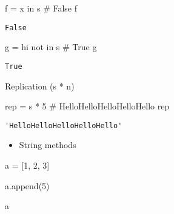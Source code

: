 \documentclass[
  letterpaper,
  DIV=11,
  numbers=noendperiod]{scrreprt}
\newenvironment{Shaded}{\begin{snugshade}}{\end{snugshade}}
\newcommand{\CommentTok}[1]{\textcolor[rgb]{0.37,0.37,0.37}{#1}}
\newcommand{\DecValTok}[1]{\textcolor[rgb]{0.68,0.00,0.00}{#1}}
\newcommand{\KeywordTok}[1]{\textcolor[rgb]{0.00,0.46,0.62}{#1}}
\newcommand{\NormalTok}[1]{\textcolor[rgb]{0.00,0.46,0.62}{#1}}
\newcommand{\OperatorTok}[1]{\textcolor[rgb]{0.37,0.37,0.37}{#1}}
\newcommand{\StringTok}[1]{\textcolor[rgb]{0.13,0.47,0.30}{#1}}
\providecommand{\tightlist}{%
  \setlength{\itemsep}{0pt}\setlength{\parskip}{0pt}}
\begin{document}
\begin{Shaded}
\begin{Highlighting}[]
\NormalTok{f }\OperatorTok{=} \StringTok{\textquotesingle{}x\textquotesingle{}} \KeywordTok{in}\NormalTok{ s            }\CommentTok{\# False}
\NormalTok{f}
\end{Highlighting}
\end{Shaded}

\begin{verbatim}
False
\end{verbatim}

\begin{Shaded}
\begin{Highlighting}[]
\NormalTok{g }\OperatorTok{=} \StringTok{\textquotesingle{}hi\textquotesingle{}} \KeywordTok{not} \KeywordTok{in}\NormalTok{ s       }\CommentTok{\# True}
\NormalTok{g}
\end{Highlighting}
\end{Shaded}

\begin{verbatim}
True
\end{verbatim}

Replication (s * n)

\begin{Shaded}
\begin{Highlighting}[]
\NormalTok{rep }\OperatorTok{=}\NormalTok{ s }\OperatorTok{*} \DecValTok{5}             \CommentTok{\# \textquotesingle{}HelloHelloHelloHelloHello\textquotesingle{}}
\NormalTok{rep}
\end{Highlighting}
\end{Shaded}

\begin{verbatim}
'HelloHelloHelloHelloHello'
\end{verbatim}

\begin{itemize}
\tightlist
\item
  String methods
\end{itemize}

\begin{Shaded}
\begin{Highlighting}[]
\NormalTok{a }\OperatorTok{=}\NormalTok{ [}\DecValTok{1}\NormalTok{, }\DecValTok{2}\NormalTok{, }\DecValTok{3}\NormalTok{]}

\NormalTok{a.append(}\DecValTok{5}\NormalTok{)}
\end{Highlighting}
\end{Shaded}

\begin{Shaded}
\begin{Highlighting}[]
\NormalTok{a}
\end{Highlighting}
\end{Shaded}
\end{document}
